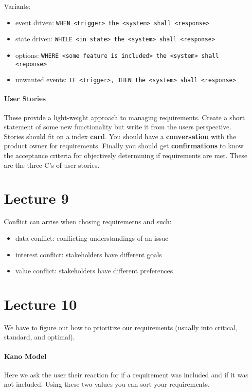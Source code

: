 \documentclass[12pt]{article}
\begin{document}
Variants:
\begin{itemize}
	\item event driven: \texttt{WHEN <trigger> the <system> shall <response>}
	\item state driven: \texttt{WHILE <in state> the <system> shall <response>}
	\item options:	\texttt{WHERE <some feature is included> the <system> shall <reponse>}
	\item unwanted events: \texttt{IF <trigger>, THEN the <system> shall <response>}
\end{itemize}

\paragraph{User Stories} 
\label{par:user_stories}
These provide a light-weight approach to managing requirements. Create a short statement of some new functionality but write it from the users perspective. Stories should fit on a index \textbf{card}. You should have a \textbf{conversation} with the product owner for requirements. Finally you should get \textbf{confirmations} to know the acceptance criteria for objectively determining if requirements are met. These are the three C's of user stories.

\section*{Lecture 9}
\label{sec:lecture_9}
Conflict can arrise when chosing requiremetns and such:
\begin{itemize}
	\item data conflict: conflicting understandings of an issue
	\item interest conflict: stakeholders have different goals
	\item value conflict: stakeholders have different preferences 
\end{itemize}

\section*{Lecture 10}
\label{sec:lecture_10}
We have to figure out how to prioritize our requirements (usually into critical, standard, and optimal). 

\paragraph{Kano Model} 
\label{par:kano_model}
Here we ask the user their reaction for if a requirement was included and if it was not included. Using these two values you can sort your requirements.
\end{document}
